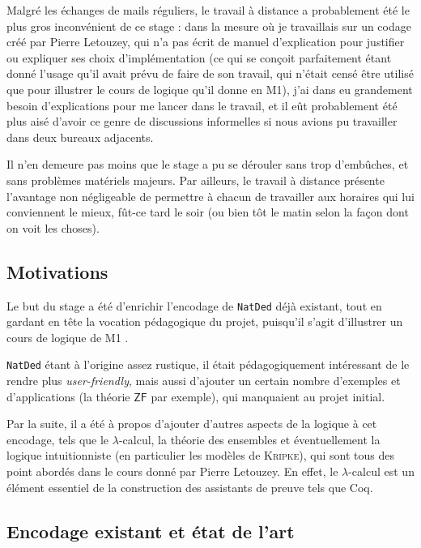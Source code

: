 \documentclass[a4paper]{article}
\newcommand{\ZF}{\mathsf{ZF}}
\theoremstyle{remark}
\theoremstyle{remark}
\theoremstyle{remark}
\theoremstyle{definition}
\theoremstyle{definition}
\theoremstyle{definition}
\begin{document}
Malgré les échanges de mails réguliers, le travail à distance a probablement été le plus gros inconvénient de ce stage : dans la mesure où je travaillais sur un codage créé par Pierre Letouzey, qui n'a pas écrit de manuel d'explication pour justifier ou expliquer ses choix d'implémentation (ce qui se conçoit parfaitement étant donné l'usage qu'il avait prévu de faire de son travail, qui n'était censé être utilisé que pour illustrer le cours de logique qu'il donne en M1), j'ai dans eu grandement besoin d'explications pour me lancer dans le travail, et il eût probablement été plus aisé d'avoir ce genre de discussions informelles si nous avions pu travailler dans deux bureaux adjacents.

Il n'en demeure pas moins que le stage a pu se dérouler sans trop d'embûches, et sans problèmes matériels majeurs. Par ailleurs, le travail à distance présente l'avantage non négligeable de permettre à chacun de travailler aux horaires qui lui conviennent le mieux, fût-ce tard le soir (ou bien tôt le matin selon la façon dont on voit les choses).

\subsection{Motivations}

Le but du stage a été d'enrichir l'encodage de \verb+NatDed+ déjà existant, tout en gardant en tête la vocation pédagogique du projet, puisqu'il s'agit d'illustrer un cours de logique de M1 \cite{poly}.

\verb+NatDed+ étant à l'origine assez rustique, il était pédagogiquement intéressant de le rendre plus \textit{user-friendly}, mais aussi d'ajouter un certain nombre d'exemples et d'applications (la théorie $\ZF$ par exemple), qui manquaient au projet initial.

Par la suite, il a été à propos d'ajouter d'autres aspects de la logique à cet encodage, tels que le $\lambda$-calcul, la théorie des ensembles et éventuellement la logique intuitionniste (en particulier les modèles de \textsc{Kripke}), qui sont tous des point abordés dans le cours donné par Pierre Letouzey. En effet, le $\lambda$-calcul est un élément essentiel de la construction des assistants de preuve tels que Coq.

\subsection{Encodage existant et état de l'art}
\end{document}
